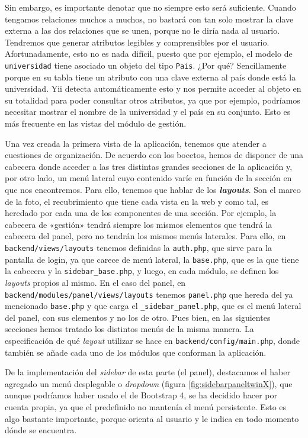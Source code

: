 Sin embargo, es importante denotar que no siempre esto será suficiente. Cuando tengamos relaciones muchos a muchos, no bastará con tan solo mostrar la clave externa a las dos relaciones que se unen, porque no le diría nada al usuario. Tendremos que generar atributos legibles y comprensibles por el usuario. Afortunadamente, esto no es nada difícil, puesto que por ejemplo, el modelo de \texttt{universidad} tiene asociado un objeto del tipo \texttt{Pais}. ¿Por qué? Sencillamente porque en su tabla tiene un atributo con una clave externa al país donde está la universidad. Yii detecta automáticamente esto y nos permite acceder al objeto en su totalidad para poder consultar otros atributos, ya que por ejemplo, podríamos necesitar mostrar el nombre de la universidad y el país en su conjunto. Esto es más frecuente en las vistas del módulo de gestión.

Una vez creada la primera vista de la aplicación, tenemos que atender a cuestiones de organización. De acuerdo con los bocetos, hemos de disponer de una cabecera donde acceder a las tres distintas grandes secciones de la aplicación y, por otro lado, un menú lateral cuyo contenido varíe en función de la sección en que nos encontremos. Para ello, tenemos que hablar de los  \textbf{\textit{layouts}}. Son el marco de la foto, el recubrimiento que tiene cada vista en la web y como tal, es heredado por cada una de los componentes de una sección. Por ejemplo, la cabecera de «gestión» tendrá siempre los mismos elementos que tendrá la cabecera del panel, pero no tendrán los mismos menús laterales. Para ello, en \texttt{backend/views/layouts} tenemos definidas la \texttt{auth.php}, que sirve para la pantalla de login, ya que carece de menú lateral, la \texttt{base.php}, que es la que tiene la cabecera y la \texttt{sidebar\_base.php}, y luego, en cada módulo, se definen los \textit{layouts} propios al mismo. En el caso del panel, en \texttt{backend/modules/panel/views/layouts} tenemos \texttt{panel.php} que hereda del ya mencionado \texttt{base.php} y que carga el \texttt{\_sidebar\_panel.php}, que es el menú lateral del panel, con sus elementos y no los de otro. Pues bien, en las siguientes secciones hemos tratado los distintos menús de la misma manera. La especificación de qué \textit{layout} utilizar se hace en \texttt{backend/config/main.php}, donde también se añade cada uno de los módulos que conforman la aplicación.

De la implementación del \textit{sidebar} de esta parte (el panel), destacamos el haber agregado un menú desplegable o \textit{dropdown} (figura \ref{fig:sidebarpaneltwinX}), que aunque podríamos haber usado el de Bootstrap 4, se ha decidido hacer por cuenta propia, ya que el predefinido no mantenía el menú persistente. Esto es algo bastante importante, porque orienta al usuario y le indica en todo momento dónde se encuentra.

